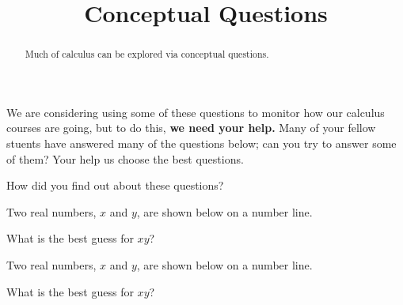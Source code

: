 \documentclass{ximera}
\title{Conceptual Questions}
\begin{document}
\begin{abstract}
  Much of calculus can be explored via conceptual questions.
\end{abstract}
\maketitle

We are considering using some of these questions to monitor how our
calculus courses are going, but to do this, \textbf{we need your
  help.}  Many of your fellow stuents have answered many of the
questions below; can you try to answer some of them?  Your help us
choose the best questions.

\begin{question}
How did you find out about these questions?
\begin{freeResponse}
\end{freeResponse}
\end{question}



\begin{problem}
  Two real numbers, $x$ and $y$, are shown below on a number line.
  \begin{image}
  \end{image}
  What is the best guess for $xy$?
  \begin{multipleChoice}
  \end{multipleChoice}
\end{problem}



\begin{problem}
  Two real numbers, $x$ and $y$, are shown below on a number line.
  \begin{image}
  \end{image}
  What is the best guess for $xy$?
  \begin{multipleChoice}
  \end{multipleChoice}
\end{problem}
\end{document}
